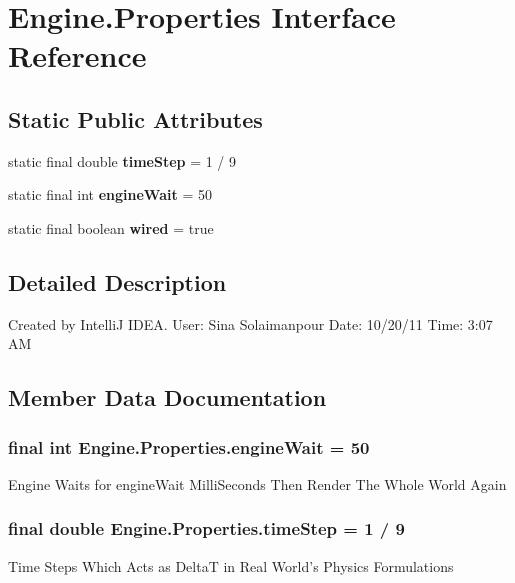 \section{Engine.Properties Interface Reference}
\label{interface_engine_1_1_properties}
\subsection*{Static Public Attributes}
\begin{DoxyCompactItemize}
\item 
static final double {\bf timeStep} = 1 / 9
\item 
static final int {\bf engineWait} = 50
\item 
static final boolean {\bf wired} = true
\end{DoxyCompactItemize}


\subsection{Detailed Description}
Created by IntelliJ IDEA. User: Sina Solaimanpour Date: 10/20/11 Time: 3:07 AM 

\subsection{Member Data Documentation}
\subsubsection[{engineWait}]{\setlength{\rightskip}{0pt plus 5cm}final int {\bf Engine.Properties.engineWait} = 50\hspace{0.3cm}{\ttfamily  [static]}}\label{interface_engine_1_1_properties_af6d32581cbe4eddbdcb9247ca68915cc}
Engine Waits for engineWait MilliSeconds Then Render The Whole World Again 
\subsubsection[{timeStep}]{\setlength{\rightskip}{0pt plus 5cm}final double {\bf Engine.Properties.timeStep} = 1 / 9\hspace{0.3cm}{\ttfamily  [static]}}\label{interface_engine_1_1_properties_a7bf35fba40c4928c6cca56d0bda158fa}
Time Steps Which Acts as DeltaT in Real World's Physics Formulations 

